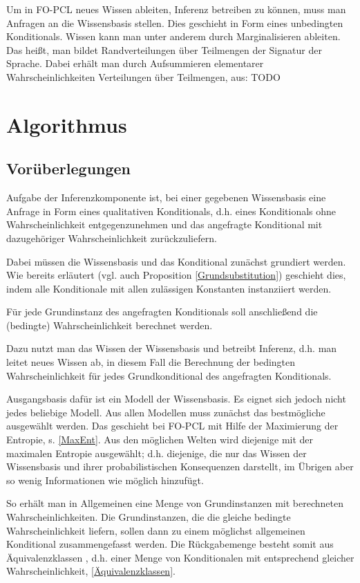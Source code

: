 \documentclass[a4paper, 11pt]{book}
\begin{document}
Um in FO-PCL neues Wissen ableiten,  Inferenz betreiben zu können, muss man Anfragen an die Wissensbasis stellen. Dies geschieht in Form eines unbedingten Konditionals. Wissen kann man unter anderem durch Marginalisieren ableiten. Das heißt, man bildet Randverteilungen über Teilmengen der Signatur der Sprache. Dabei erhält man durch Aufsummieren elementarer Wahrscheinlichkeiten Verteilungen über Teilmengen, aus: \cite[Anhang A.2]{BKI08}
TODO


\chapter{Algorithmus} \label{Alg}

\section{Vorüberlegungen}
Aufgabe der Inferenzkomponente ist, bei einer gegebenen Wissensbasis eine Anfrage in Form eines qualitativen Konditionals, d.h. eines Konditionals ohne Wahrscheinlichkeit entgegenzunehmen und das angefragte Konditional mit dazugehöriger Wahrscheinlichkeit zurückzuliefern.

Dabei müssen die Wissensbasis und das Konditional zunächst grundiert werden. Wie bereits erläutert (vgl. auch Proposition \ref{Grundsubstitution}) geschieht dies, indem alle Konditionale mit allen zulässigen Konstanten instanziiert werden.

Für jede Grundinstanz des angefragten Konditionals soll anschließend die (bedingte) Wahrscheinlichkeit berechnet werden.

Dazu nutzt man das Wissen der Wissensbasis und betreibt Inferenz, d.h. man leitet neues Wissen ab,  in diesem Fall die Berechnung der bedingten Wahrscheinlichkeit für jedes Grundkonditional  des angefragten Konditionals.

Ausgangsbasis dafür ist ein Modell der Wissensbasis. Es eignet sich jedoch nicht jedes beliebige Modell. Aus allen Modellen muss zunächst das bestmögliche ausgewählt werden.
Das geschieht bei FO-PCL mit Hilfe der Maximierung der Entropie, s. \ref{MaxEnt}. Aus den möglichen Welten wird diejenige mit der maximalen Entropie ausgewählt; d.h. diejenige, die nur das Wissen der Wissensbasis und ihrer probabilistischen Konsequenzen darstellt, im Übrigen aber so wenig Informationen wie möglich hinzufügt.

So erhält man in Allgemeinen eine Menge von Grundinstanzen mit berechneten Wahrscheinlichkeiten.
Die Grundinstanzen, die die gleiche bedingte Wahrscheinlichkeit liefern, sollen dann zu einem möglichst allgemeinen Konditional zusammengefasst werden. Die Rückgabemenge besteht somit aus Äquivalenzklassen  , d.h. einer Menge von Konditionalen mit entsprechend gleicher Wahrscheinlichkeit, \ref{Äquivalenzklassen}. 
\end{document}
